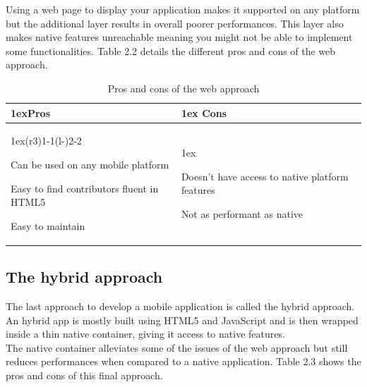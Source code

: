 \documentclass{eplmastersthesis}
\begin{document}
Using a web page to display your application makes it supported on any platform but the additional layer results in overall poorer performances. This layer also makes native features unreachable meaning you might not be able to implement some functionalities. Table 2.2 details the different pros and cons of the web approach.\\


\begin{table}[H]
\begin{tabularx}{\linewidth}{>{\parskip1ex}X@{\kern4\tabcolsep}>{\parskip1ex}X}
\toprule
\hfil\bfseries Pros
&
\hfil\bfseries Cons
\\\cmidrule(r{3\tabcolsep}){1-1}\cmidrule(l{-\tabcolsep}){2-2}

Can be used on any mobile platform\par
Easy to find contributors fluent in HTML5\par
Easy to maintain\par

&

Doesn't have access to native platform features\par
Not as performant as native\par



\\\bottomrule
\end{tabularx}
\caption{Pros and cons of the web approach}
\end{table}
\subsection{The hybrid approach}

The last approach to develop a mobile application is called the hybrid approach. An hybrid app is mostly built using HTML5 and JavaScript and is then wrapped inside a thin native container, giving it access to native features.\\

The native container alleviates some of the issues of the web approach but still reduces performances when compared to a native application. Table 2.3 shows the pros and cons of this final approach.
\end{document}
